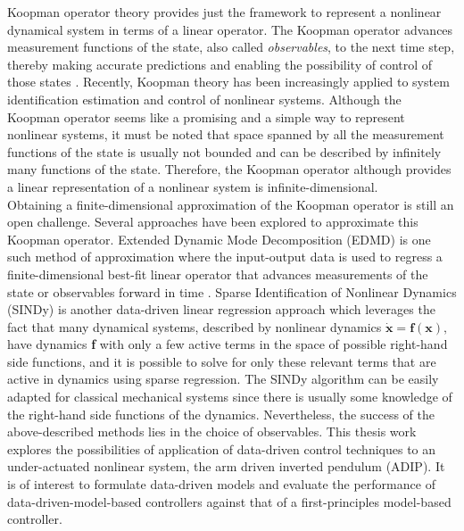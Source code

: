 % 
% 
\par
Koopman operator theory provides just the framework to represent a nonlinear dynamical system in terms of a linear operator. The Koopman operator advances measurement functions of the state, also called \textit{observables}, to the next time step, thereby making accurate predictions and enabling the possibility of control of those states \cite{spectral_NL}. Recently, Koopman theory has been increasingly applied to system identification \cite{SI_Mezic, mauroy2016linear, proctor2016generalizing, WILLIAMS2016704} estimation \cite{Amit_Surana} and control \cite{MPC_Korda, Abraham} of nonlinear systems. Although the Koopman operator seems like a promising and a simple way to represent nonlinear systems, it must be noted that space spanned by all the measurement functions of the state is usually not bounded and can be described by infinitely many functions of the state. Therefore, the Koopman operator although provides a linear representation of a nonlinear system is infinite-dimensional.\\
 Obtaining a finite-dimensional approximation of the Koopman operator is still an open challenge. Several approaches have been explored to approximate this Koopman operator. Extended Dynamic Mode Decomposition (EDMD) is one such method of approximation where the input-output data is used to regress a finite-dimensional best-fit linear operator that advances measurements of the state or observables forward in time \cite{DMD_book, EDMD_1,Brunton_K_invariant_sub,MPC_Korda}. Sparse Identification of Nonlinear Dynamics (SINDy) \cite{SINDy,brunton_kutz_2019} is another data-driven linear regression approach which leverages the fact that many dynamical systems, described by nonlinear dynamics $\dot{\mathbf{x}} = \textbf{f}(\mathbf{x}),$ have dynamics \textbf{f} with only a few active terms in the space of possible right-hand side functions, and it is possible to solve for only these relevant terms that are active in dynamics using sparse regression. The SINDy algorithm can be easily adapted for classical mechanical systems since there is usually some knowledge of the right-hand side functions of the dynamics. Nevertheless, the success of the above-described methods lies in the choice of observables. This thesis work explores the possibilities of application of data-driven control techniques to an under-actuated nonlinear system, the arm driven inverted pendulum (ADIP). It is of interest to formulate data-driven models and evaluate the performance of data-driven-model-based controllers against that of a first-principles model-based controller.\par

